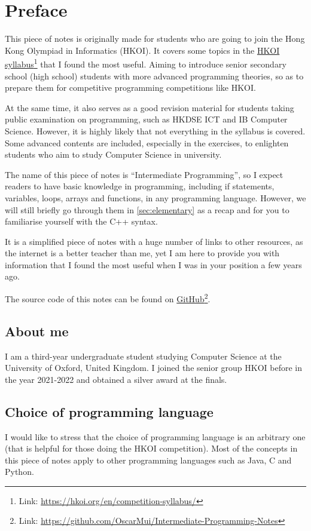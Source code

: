 \chapter*{Preface}

This piece of notes is originally made for students who are going to join the Hong Kong Olympiad in Informatics (HKOI). It covers some topics in the \href{https://hkoi.org/en/competition-syllabus/}{HKOI syllabus}\footnote{Link: \url{https://hkoi.org/en/competition-syllabus/}} that I found the most useful. Aiming to introduce senior secondary school (high school) students with more advanced programming theories, so as to prepare them for competitive programming competitions like HKOI. 

At the same time, it also serves as a good revision material for students taking public examination on programming, such as HKDSE ICT and IB Computer Science. However, it is highly likely that not everything in the syllabus is covered. Some advanced contents are included, especially in the exercises, to enlighten students who aim to study Computer Science in university. 

The name of this piece of notes is ``Intermediate Programming'', so I expect readers to have basic knowledge in programming, including if statements, variables, loops, arrays and functions, in any programming language. However, we will still briefly go through them in \cref{sec:elementary} as a recap and for you to familiarise yourself with the C++ syntax.

It is a simplified piece of notes with a huge number of links to other resources, as the internet is a better teacher than me, yet I am here to provide you with information that I found the most useful when I was in your position a few years ago.

The source code of this notes can be found on \href{https://github.com/OscarMui/Intermediate-Programming-Notes}{GitHub}\footnote{Link: \url{https://github.com/OscarMui/Intermediate-Programming-Notes}}.

\section*{About me}

I am a third-year undergraduate student studying Computer Science at the University of Oxford, United Kingdom. I joined the senior group HKOI before in the year 2021-2022 and obtained a silver award at the finals. 

\section*{Choice of programming language}
I would like to stress that the choice of programming language is an arbitrary one (that is helpful for those doing the HKOI competition). Most of the concepts in this piece of notes apply to other programming languages such as Java, C and Python.


